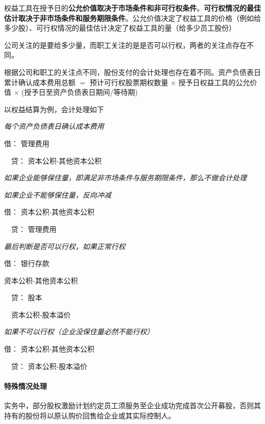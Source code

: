 \documentclass[UTF8,12pt]{ctexart}
\newenvironment{Dr}{\noindent 借：}{\par}
\newenvironment{Cr}{\noindent \ \ 贷：}{\par}
\numberwithin{equation}{section} %
\numberwithin{figure}{section}
\numberwithin{table}{section}
\begin{document}
	权益工具在授予日的\textbf{公允价值取决于市场条件和非可行权条件}。\textbf{可行权情况的最佳估计取决于非市场条件和服务期限条件}。公允价值决定了权益工具的价格（例如给多少股）、可行权情况的最佳估计决定了权益工具的量（给多少员工股份）
	
	公司关注的是要给多少量，而职工关注的是是否可以行权，两者的关注点存在不同。
	
	根据公司和职工的关注点不同，股份支付的会计处理也存在着不同。资产负债表日累计确认成本费用总额 $=$ 预计可行权股票期权数量 $\times$ 授予日权益工具的公允价值 $\times$ (授予日至资产负债表日期间/等待期)
	
	以权益结算为例，会计处理如下
	
	\textit{每个资产负债表日确认成本费用}
	
	\begin{Dr}
		管理费用
	\end{Dr}
	\begin{Cr}
		资本公积-其他资本公积
	\end{Cr}

	\textit{如果企业能够保住量，即满足非市场条件与服务期限条件，那么不做会计处理}
	
	\textit{如果企业不能够保住量，反向冲减}
	
	\begin{Dr}
		资本公积-其他资本公积
	\end{Dr}
	\begin{Cr}
		管理费用
	\end{Cr}

	\textit{最后判断是否可以行权，如果正常行权}
	
	\begin{Dr}
		银行存款
		
		资本公积-其他资本公积
	\end{Dr}
	\begin{Cr}
		股本
		
		\ \ 资本公积-股本溢价
	\end{Cr}

	\textit{如果不可以行权（企业没保住量必然不能行权）}
	
	\begin{Dr}
		资本公积-其他资本公积
	\end{Dr}
	\begin{Cr}
		资本公积-股本溢价
	\end{Cr}
	
	\paragraph{特殊情况处理}
	实务中，部分股权激励计划约定员工须服务至企业成功完成首次公开募股，否则其持有的股份将以原认购价回售给企业或其实际控制人。
	
\end{document}
